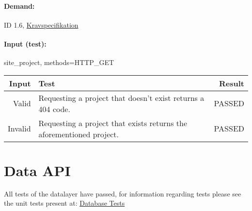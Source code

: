 \documentclass{TDP003mall}
\begin{document}
\subsection{}
\paragraph{Demand: }ID 1.6, \href{https://www.ida.liu.se/~TDP003/current/projekt/dokument/systemspecifikation.pdf}{Kravspecifikation}
\paragraph{Input (test):}
site\_project,  methods=HTTP\_GET

\begin{table}[!h]
\begin{tabularx}{\linewidth}{|r|X|r|}\hline
\textbf{Input} & \textbf{Test} & \textbf{ Result} \\\hline
Valid & Requesting a project that doesn't exist returns a 404 code.  & PASSED \\\hline
Invalid & Requesting a project that exists returns the aforementioned project.  & PASSED \\\hline
\end{tabularx}
\end{table}

\section{Data API}
All tests of the datalayer have passed, for information regarding tests
please see the unit tests present at: \href{https://gitlab.ida.liu.se/filst04/tdp003-2018-database-tests}{Database Tests}
\end{document}
